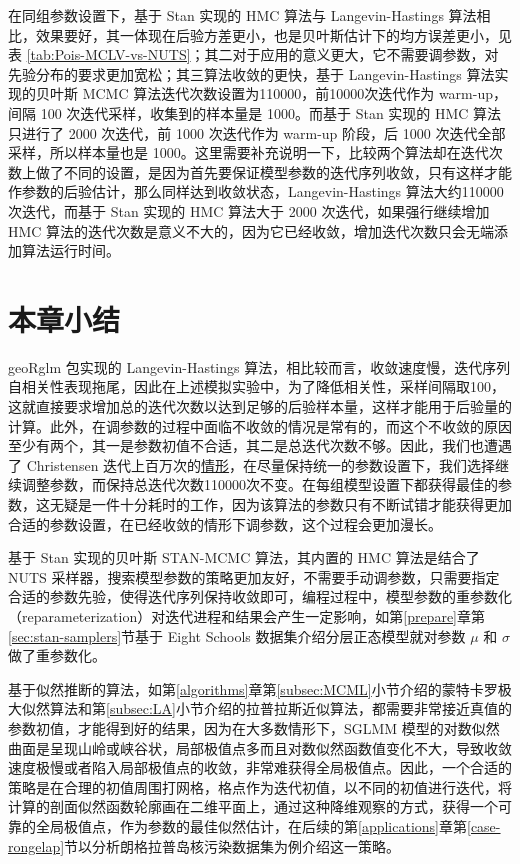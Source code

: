 \documentclass[12pt,a4paper,UTF8,twoside]{book}
\theoremstyle{definition}
\theoremstyle{definition}
\theoremstyle{definition}
\theoremstyle{remark}
\begin{document}
在同组参数设置下，基于 Stan 实现的 HMC 算法与 Langevin-Hastings
算法相比，效果要好，其一体现在后验方差更小，也是贝叶斯估计下的均方误差更小，见表
\ref{tab:Pois-MCLV-vs-NUTS}；其二对于应用的意义更大，它不需要调参数，对先验分布的要求更加宽松；其三算法收敛的更快，基于
Langevin-Hastings 算法实现的贝叶斯 MCMC
算法迭代次数设置为110000，前10000次迭代作为 warm-up，间隔 100
次迭代采样，收集到的样本量是 1000。而基于 Stan 实现的 HMC 算法只进行了
2000 次迭代，前 1000 次迭代作为 warm-up 阶段，后 1000
次迭代全部采样，所以样本量也是
1000。这里需要补充说明一下，比较两个算法却在迭代次数上做了不同的设置，是因为首先要保证模型参数的迭代序列收敛，只有这样才能作参数的后验估计，那么同样达到收敛状态，Langevin-Hastings
算法大约110000次迭代，而基于 Stan 实现的 HMC 算法大于 2000
次迭代，如果强行继续增加 HMC
算法的迭代次数是意义不大的，因为它已经收敛，增加迭代次数只会无端添加算法运行时间。

\hypertarget{sec:simulations}{%
\section{本章小结}\label{sec:simulations}}

geoRglm 包实现的 Langevin-Hastings
算法，相比较而言，收敛速度慢，迭代序列自相关性表现拖尾，因此在上述模拟实验中，为了降低相关性，采样间隔取100，这就直接要求增加总的迭代次数以达到足够的后验样本量，这样才能用于后验量的计算。此外，在调参数的过程中面临不收敛的情况是常有的，而这个不收敛的原因至少有两个，其一是参数初值不合适，其二是总迭代次数不够。因此，我们也遭遇了
Christensen
迭代上百万次的\href{http://gbi.agrsci.dk/~ofch/geoRglm/Intro/books.html}{情形}，在尽量保持统一的参数设置下，我们选择继续调整参数，而保持总迭代次数110000次不变。在每组模型设置下都获得最佳的参数，这无疑是一件十分耗时的工作，因为该算法的参数只有不断试错才能获得更加合适的参数设置，在已经收敛的情形下调参数，这个过程会更加漫长。

基于 Stan 实现的贝叶斯 STAN-MCMC 算法，其内置的 HMC 算法是结合了 NUTS
采样器\citep{hoffman2014}，搜索模型参数的策略更加友好，不需要手动调参数，只需要指定合适的参数先验，使得迭代序列保持收敛即可，编程过程中，模型参数的重参数化（reparameterization）对迭代进程和结果会产生一定影响，如第\ref{prepare}章第\ref{sec:stan-samplers}节基于
Eight Schools 数据集介绍分层正态模型就对参数 \(\mu\) 和 \(\sigma\)
做了重参数化。

基于似然推断的算法，如第\ref{algorithms}章第\ref{subsec:MCML}小节介绍的蒙特卡罗极大似然算法和第\ref{subsec:LA}小节介绍的拉普拉斯近似算法，都需要非常接近真值的参数初值，才能得到好的结果，因为在大多数情形下，SGLMM
模型的对数似然曲面是呈现山岭或峡谷状，局部极值点多而且对数似然函数值变化不大，导致收敛速度极慢或者陷入局部极值点的收敛，非常难获得全局极值点。因此，一个合适的策略是在合理的初值周围打网格，格点作为迭代初值，以不同的初值进行迭代，将计算的剖面似然函数轮廓画在二维平面上，通过这种降维观察的方式，获得一个可靠的全局极值点，作为参数的最佳似然估计，在后续的第\ref{applications}章第\ref{case-rongelap}节以分析朗格拉普岛核污染数据集为例介绍这一策略。
\end{document}
